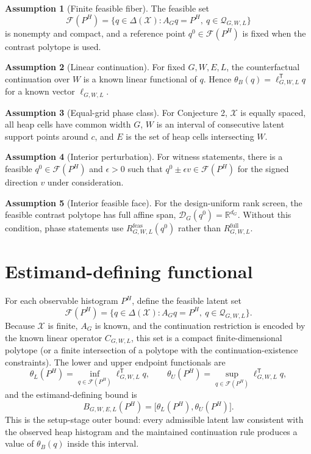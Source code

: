 \documentclass[11pt]{article}
\newcommand{\transpose}{\mathsf{T}}
\theoremstyle{definition}
\newtheorem{assumption}{Assumption}
\theoremstyle{plain}
\theoremstyle{remark}
\begin{document}
\begin{assumption}[Finite feasible fiber]\label{ass:fiber}
The feasible set
\[
\mathcal{F}(P^H)=\{q\in\Delta(\mathcal{X}):A_Gq=P^H,\ q\in\mathcal{Q}_{G,W,L}\}
\]
is nonempty and compact, and a reference point \(q^0\in\mathcal{F}(P^H)\) is fixed when the contrast polytope is used.
\end{assumption}

\begin{assumption}[Linear continuation]\label{ass:linear-cont}
For fixed \(G,W,E,L\), the counterfactual continuation over \(W\) is a known linear functional of \(q\).  Hence \(\theta_B(q)=\ell_{G,W,L}^{\transpose}q\) for a known vector \(\ell_{G,W,L}\).
\end{assumption}

\begin{assumption}[Equal-grid phase class]\label{ass:equal-grid}
For Conjecture 2, \(\mathcal{X}\) is equally spaced, all heap cells have common width \(G\), \(W\) is an interval of consecutive latent support points around \(c\), and \(E\) is the set of heap cells intersecting \(W\).
\end{assumption}

\begin{assumption}[Interior perturbation]\label{ass:interior}
For witness statements, there is a feasible \(q^0\in\mathcal{F}(P^H)\) and \(\epsilon>0\) such that \(q^0\pm\epsilon v\in\mathcal{F}(P^H)\) for the signed direction \(v\) under consideration.
\end{assumption}

\begin{assumption}[Interior feasible face]\label{ass:face}
For the design-uniform rank screen, the feasible contrast polytope has full affine span, \(\mathcal{D}_G(q^0)=\mathbb{R}^{d_G}\).  Without this condition, phase statements use \(R^{\mathrm{feas}}_{G,W,L}(q^0)\) rather than \(R^{\mathrm{full}}_{G,W,L}\).
\end{assumption}

\section{Estimand-defining functional}
For each observable histogram \(P^H\), define the feasible latent set
\[
\mathcal{F}(P^H)=\{q\in\Delta(\mathcal{X}):A_Gq=P^H,\ q\in\mathcal{Q}_{G,W,L}\}.
\]
Because \(\mathcal{X}\) is finite, \(A_G\) is known, and the continuation restriction is encoded by the known linear operator \(C_{G,W,L}\), this set is a compact finite-dimensional polytope (or a finite intersection of a polytope with the continuation-existence constraints).  The lower and upper endpoint functionals are
\[
\theta_L(P^H)=\inf_{q\in\mathcal{F}(P^H)} \ell_{G,W,L}^{\transpose}q,
\qquad
\theta_U(P^H)=\sup_{q\in\mathcal{F}(P^H)} \ell_{G,W,L}^{\transpose}q,
\]
and the estimand-defining bound is
\[
B_{G,W,E,L}(P^H)=\bigl[\theta_L(P^H),\theta_U(P^H)\bigr].
\]
This is the setup-stage outer bound: every admissible latent law consistent with the observed heap histogram and the maintained continuation rule produces a value of \(\theta_B(q)\) inside this interval.
\end{document}
